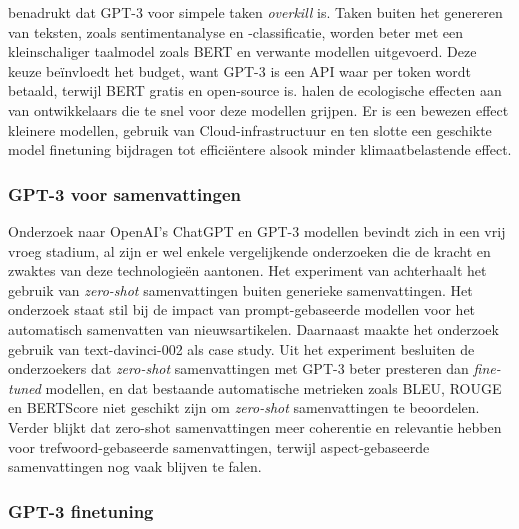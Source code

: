 
\textcite{Li2022} benadrukt dat GPT-3 voor simpele taken \textit{overkill} is. Taken buiten het genereren van teksten, zoals sentimentanalyse en -classificatie, worden beter met een kleinschaliger taalmodel zoals BERT en verwante modellen uitgevoerd. Deze keuze beïnvloedt het budget, want GPT-3 is een API waar per token wordt betaald, terwijl BERT gratis en open-source is. \textcite{Strubell2019, Simon2021} halen de ecologische effecten aan van ontwikkelaars die te snel voor deze modellen grijpen. Er is een bewezen effect kleinere modellen, gebruik van Cloud-infrastructuur en ten slotte een geschikte model finetuning bijdragen tot efficiëntere alsook minder klimaatbelastende effect.


\subsubsection{GPT-3 voor samenvattingen}

Onderzoek naar OpenAI's ChatGPT en GPT-3 modellen bevindt zich in een vrij vroeg stadium, al zijn er wel enkele vergelijkende onderzoeken die de kracht en zwaktes van deze technologieën aantonen. Het experiment van \textcite{Goyal2022} achterhaalt het gebruik van \textit{zero-shot} samenvattingen buiten generieke samenvattingen. Het onderzoek staat stil bij de impact van prompt-gebaseerde modellen voor het automatisch samenvatten van nieuwsartikelen. Daarnaast maakte het onderzoek gebruik van text-davinci-002 als case study. Uit het experiment besluiten de onderzoekers dat \textit{zero-shot} samenvattingen met GPT-3 beter presteren dan \textit{fine-tuned} modellen, en dat bestaande automatische metrieken zoals BLEU, ROUGE en BERTScore niet geschikt zijn om \textit{zero-shot} samenvattingen te beoordelen. Verder blijkt dat zero-shot samenvattingen meer coherentie en relevantie hebben voor trefwoord-gebaseerde samenvattingen, terwijl aspect-gebaseerde samenvattingen nog vaak blijven te falen.

\subsubsection{GPT-3 finetuning}

